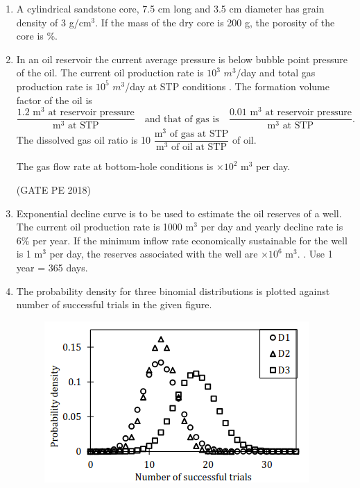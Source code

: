 \documentclass[journal,12pt,onecolumn]{IEEEtran}
\theoremstyle{remark}
\begin{document}
\begin{enumerate}
\item A cylindrical sandstone core, 7.5 cm long and 3.5 cm diameter has grain density of 3 g/cm$^3$. If the mass of the dry core is 200 g, the porosity of the core is \underline{\hspace{3cm}} \%.\\

\hfill{}

\item In an oil reservoir the current average pressure is below bubble point pressure of the oil. The current oil production rate is $10^3$ $m^3$/day and total gas production rate is $10^5$ $m^3$/day at STP conditions . The formation volume factor of the oil is
\[
\frac{1.2 \text{ m}^3 \text{ at reservoir pressure}}{\text{m}^3 \text{ at STP}} \quad \text{and that of gas is} \quad \frac{0.01 \text{ m}^3 \text{ at reservoir pressure}}{\text{m}^3 \text{ at STP}}.
\]
The dissolved gas oil ratio is 10 $\dfrac{\text{m}^3 \text{ of gas at STP}}{\text{m}^3 \text{ of oil at STP}}$ of oil.

The gas flow rate at bottom-hole conditions is \underline{\hspace{1.5cm}} $\times 10^2$ m$^3$ per day.\\ 

\hfill(GATE PE 2018)

\item Exponential decline curve is to be used to estimate the oil reserves of a well. The current oil production rate is 1000 m$^3$ per day and yearly decline rate is 6\% per year. If the minimum inflow rate economically sustainable for the well is 1 m$^3$ per day, the reserves  associated with the well are \underline{\hspace{2cm}} $\times 10^6$ m$^3$. . Use 1 year = 365 days.

\hfill{}

\pagebreak

\item The probability density for three binomial distributions  is plotted against
number of successful trials in the given figure.

\hfill{}

\begin{figure}[h!]
  \centering
  \includegraphics[width=0.6\columnwidth]{figs/pic8.png} 
\end{figure}


\end{enumerate}
\end{document}
